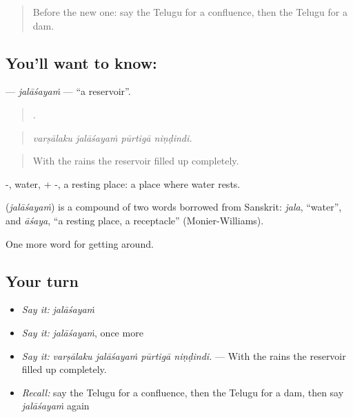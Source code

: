 \label{lesson:TE-C475-jalasayam}



\begin{quote}
Before the new one: say the Telugu for a confluence, then the Telugu for a dam.
\end{quote}

\subsection*{You'll want to know: }
\textbf{} — \emph{jalāśayaṁ} — \textquotedblleft{}a reservoir\textquotedblright{}.

\begin{quote}
   .
\end{quote}

\begin{quote}
\emph{varṣālaku jalāśayaṁ pūrtigā niṇḍindi.}
\end{quote}

\begin{quote}
With the rains the reservoir filled up completely.
\end{quote}

-, water, + -, a resting place: a place where water rests.

\begin{cousinweb}
\textbf{} (\emph{jalāśayaṁ}) is a compound of two words borrowed from Sanskrit: \emph{jala}, \textquotedblleft{}water\textquotedblright{}, and \emph{āśaya}, \textquotedblleft{}a resting place, a receptacle\textquotedblright{} (Monier-Williams).
\end{cousinweb}

\begin{grammarlens}[title={What you've built}]
One more word for getting around.
\end{grammarlens}

\subsection*{Your turn}
\begin{itemize}
\raggedright
  \item \emph{Say it:} \emph{jalāśayaṁ}
  \item \emph{Say it:} \emph{jalāśayaṁ}, once more
  \item \emph{Say it:} \emph{varṣālaku jalāśayaṁ pūrtigā niṇḍindi.} — With the rains the reservoir filled up completely.
  \item \emph{Recall:} say the Telugu for a confluence, then the Telugu for a dam, then say \emph{jalāśayaṁ} again
\end{itemize}

